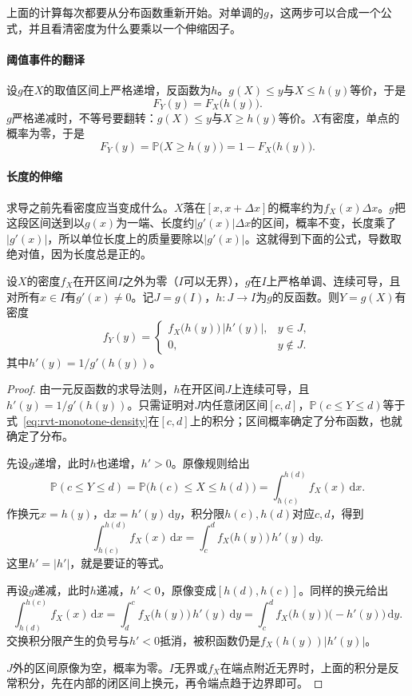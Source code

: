 上面的计算每次都要从分布函数重新开始。对单调的$g$，这两步可以合成一个公式，并且看清密度为什么要乘以一个伸缩因子。

\paragraph{阈值事件的翻译}
设$g$在$X$的取值区间上严格递增，反函数为$h$。$g(X)\leq y$与$X\leq h(y)$等价，于是
\[
 F_Y(y)=F_X\bigl(h(y)\bigr) .
\]
$g$严格递减时，不等号要翻转：$g(X)\leq y$与$X\geq h(y)$等价。$X$有密度，单点的概率为零，于是
\[
 F_Y(y)=\mathbb{P}\bigl(X\geq h(y)\bigr)=1-F_X\bigl(h(y)\bigr) .
\]

\paragraph{长度的伸缩}
求导之前先看密度应当变成什么。$X$落在$[x,x+\Delta x]$的概率约为$f_X(x)\Delta x$。$g$把这段区间送到以$g(x)$为一端、长度约$\lvert g'(x)\rvert\Delta x$的区间，概率不变，长度乘了$\lvert g'(x)\rvert$，所以单位长度上的质量要除以$\lvert g'(x)\rvert$。这就得到下面的公式，导数取绝对值，因为长度总是正的。

\begin{theorem}[单调变换的密度]
\label{thm:rvt-monotone-density}
设$X$的密度$f_X$在开区间$I$之外为零（$I$可以无界），$g$在$I$上严格单调、连续可导，且对所有$x\in I$有$g'(x)\neq0$。记$J=g(I)$，$h:J\to I$为$g$的反函数。则$Y=g(X)$有密度
\begin{equation}
 f_Y(y)=
 \begin{cases}
  f_X\bigl(h(y)\bigr)\,\lvert h'(y)\rvert, & y\in J,\\
  0, & y\notin J .
 \end{cases}
 \label{eq:rvt-monotone-density}
\end{equation}
其中$h'(y)=1/g'(h(y))$。
\end{theorem}

\begin{proof}
由一元反函数的求导法则，$h$在开区间$J$上连续可导，且$h'(y)=1/g'(h(y))$。只需证明对$J$内任意闭区间$[c,d]$，$\mathbb{P}(c\leq Y\leq d)$等于式~\eqref{eq:rvt-monotone-density}在$[c,d]$上的积分；区间概率确定了分布函数，也就确定了分布。

先设$g$递增，此时$h$也递增，$h'>0$。原像规则给出
\[
 \mathbb{P}(c\leq Y\leq d)=\mathbb{P}\bigl(h(c)\leq X\leq h(d)\bigr)=\int_{h(c)}^{h(d)}f_X(x)\,\mathrm{d}x .
\]
作换元$x=h(y)$，$\mathrm{d}x=h'(y)\,\mathrm{d}y$，积分限$h(c),h(d)$对应$c,d$，得到
\[
 \int_{h(c)}^{h(d)}f_X(x)\,\mathrm{d}x=\int_c^d f_X\bigl(h(y)\bigr)\,h'(y)\,\mathrm{d}y .
\]
这里$h'=\lvert h'\rvert$，就是要证的等式。

再设$g$递减，此时$h$递减，$h'<0$，原像变成$[h(d),h(c)]$。同样的换元给出
\[
 \int_{h(d)}^{h(c)}f_X(x)\,\mathrm{d}x=\int_d^c f_X\bigl(h(y)\bigr)\,h'(y)\,\mathrm{d}y=\int_c^d f_X\bigl(h(y)\bigr)\bigl(-h'(y)\bigr)\,\mathrm{d}y .
\]
交换积分限产生的负号与$h'<0$抵消，被积函数仍是$f_X(h(y))\lvert h'(y)\rvert$。

$J$外的区间原像为空，概率为零。$I$无界或$f_X$在端点附近无界时，上面的积分是反常积分，先在内部的闭区间上换元，再令端点趋于边界即可。
\end{proof}

